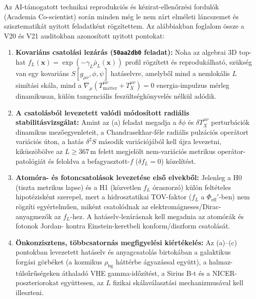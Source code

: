 \documentclass[10pt,a4paper]{article}
\begin{document}
{\small\setlength{\parskip}{1.6pt}
\vspace{-2mm}\par\vspace{0.5pt}
Az AI-t\'amogatott technikai reprodukci\'os \'es k\'ezirat-ellen\H{o}rz\'esi fordul\'ok (Academia Co-scientist) sor\'an minden m\'eg le nem z\'art elm\'eleti l\'ancszemet \'es szisztematik\'at nyitott feladatk\'ent r\"ogz\'itettem. Az al\'abbiakban foglalom \"ossze a V20 \'es V21 auditokban azonos\'itott nyitott pontokat:

\begin{enumerate}\setlength{\itemsep}{1.5pt}\setlength{\parskip}{0pt}\setlength{\topsep}{1pt}
  \item[\textbf{(a)}] \textbf{Kovari\'ans csatol\'asi lez\'ar\'as (\texttt{50aa2db0} feladat):} Noha az algebrai 3D top-hat $f_L(\mathbf{x}) = \exp(-\gamma_L\bar{\rho}_L(\mathbf{x}))$ profil r\"ogz\'itett \'es reproduk\'alhat\'o, sz\"uks\'eg van egy kovari\'ans $S[g_{\mu\nu},\phi,\psi]$ hat\'aselvre, amelyb\H{o}l mind a nemlok\'alis $L$ sim\'it\'asi sk\'ala, mind a $\nabla_\mu(T^{\mu\nu}_{\text{matter}} + T^{\mu\nu}_X) = 0$ energia-impulzus m\'erleg dinamikusan, k\"ul\"on tangenci\'alis fesz\"ults\'egk\"onyvel\'es n\'elk\"ul ad\'odik.
  \item[\textbf{(b)}] \textbf{A csatol\'asb\'ol levezetett val\'odi m\'odos\'itott radi\'alis stabilit\'asvizsg\'alat:} Amint az (a) feladat megadja a $\delta\phi$ \'es $\delta T^{\mu\nu}_X$ perturb\'aci\'ok dinamikus mez\H{o}egyenleteit, a Chandrasekhar-f\'ele radi\'alis pulz\'aci\'os oper\'atort vari\'aci\'os \'uton, a hat\'as $\delta^2 S$ m\'asodik vari\'aci\'oj\'ab\'ol kell \'ujra levezetni, kik\"usz\"ob\"olve az $L \ge 367\,\text{m}$ felett megjel\"olt nem-vari\'aci\'os metrikus oper\'ator-patol\'ogi\'at \'es feloldva a befagyasztott-$f$ ($\delta f_L = 0$) k\"ozel\'it\'est.
  \item[\textbf{(c)}] \textbf{Atom\'ora- \'es fotoncsatol\'asok levezet\'ese els\H{o} elvekb\H{o}l:} Jelenleg a H0 (tiszta metrikus lapse) \'es a H1 (k\"ozvetlen $f_L$ \'oraszorz\'o) k\"ul\"on felt\'eteles hipot\'ezisk\'ent szerepel, mert a hidrosztatikai TOV-faktor ($f_L$ a $\Phi_{\text{eff}}'$-ben) nem r\"ogz\'iti egy\'ertelm\H{u}en, mik\'ent csatol\'odnak az elektrom\'agneses/Dirac-anyagmez\H{o}k az $f_L$-hez. A hat\'aselv-lez\'ar\'asnak kell megadnia az atom\'or\'ak \'es fotonok Jordan- kontra Einstein-keretbeli konform/diszform csatol\'as\'at.
  \item[\textbf{(d)}] \textbf{\"Onkonzisztens, t\"obbcsatorn\'as megfigyel\'esi ki\'ert\'ekel\'es:} Az (a)--(c) pontokban levezetett hat\'aselv \'es anyagcsatol\'as birtok\'aban a galaktikus forg\'asi g\"orb\'eket (a kozmikus $\rho_{\text{bg}}$ h\'att\'erbe \'agyaz\'assal egy\"utt), a halmaz-t\'uls\H{u}r\H{u}s\'egeken \'athalad\'o VHE gamma-id\H{o}z\'it\'est, a Sirius B-t \'es a NICER-poszteriorokat egy\"uttesen, az $L$ fizikai sk\'alav\'alaszt\'asi mechanizmus\'aval kell illeszteni.
\end{enumerate}

}
\end{document}
